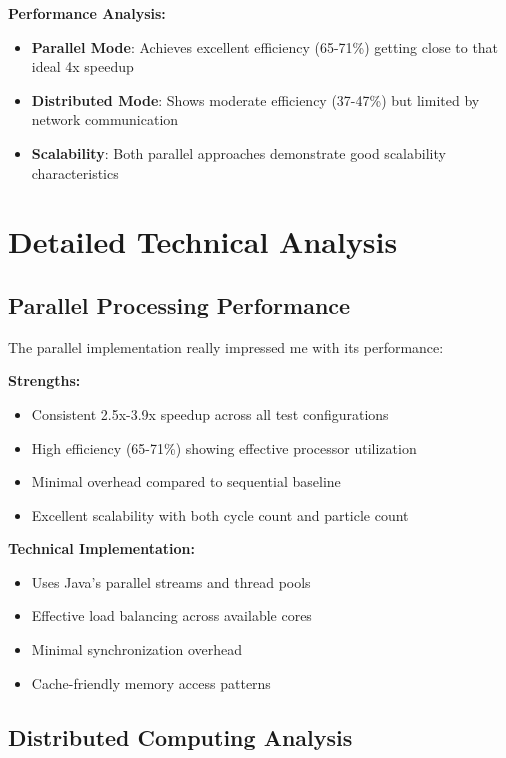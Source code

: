 \documentclass[12pt,a4paper]{article}
\begin{document}
\textbf{Performance Analysis:}
\begin{itemize}
    \item \textbf{Parallel Mode}: Achieves excellent efficiency (65-71\%) getting close to that ideal 4x speedup
    \item \textbf{Distributed Mode}: Shows moderate efficiency (37-47\%) but limited by network communication
    \item \textbf{Scalability}: Both parallel approaches demonstrate good scalability characteristics
\end{itemize}

\section{Detailed Technical Analysis}

\subsection{Parallel Processing Performance}

The parallel implementation really impressed me with its performance:

\textbf{Strengths:}
\begin{itemize}
    \item Consistent 2.5x-3.9x speedup across all test configurations
    \item High efficiency (65-71\%) showing effective processor utilization
    \item Minimal overhead compared to sequential baseline
    \item Excellent scalability with both cycle count and particle count
\end{itemize}

\textbf{Technical Implementation:}
\begin{itemize}
    \item Uses Java's parallel streams and thread pools
    \item Effective load balancing across available cores
    \item Minimal synchronization overhead
    \item Cache-friendly memory access patterns
\end{itemize}

\subsection{Distributed Computing Analysis}
\end{document}

